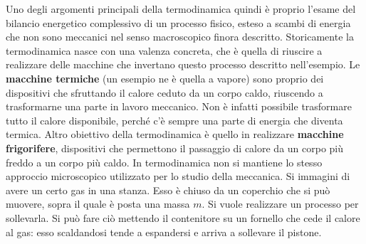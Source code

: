 \documentclass[10pt,a4paper]{book}
\begin{document}
Uno degli argomenti principali della termodinamica quindi è proprio l'esame del bilancio energetico complessivo di un processo fisico, esteso a scambi di energia che non sono meccanici nel senso macroscopico finora descritto.
Storicamente la termodinamica nasce con una valenza concreta, che è quella di riuscire a realizzare delle macchine che invertano questo processo descritto nell'esempio. Le \textbf{macchine termiche} (un esempio ne è quella a vapore) sono proprio dei dispositivi che sfruttando il calore ceduto da un corpo caldo, riuscendo a trasformarne una parte in lavoro meccanico. Non è infatti possibile trasformare tutto il calore disponibile, perché c'è sempre una parte di energia che diventa termica. Altro obiettivo della termodinamica è quello in realizzare \textbf{macchine frigorifere}, dispositivi che permettono il passaggio di calore da un corpo più freddo a un corpo più caldo.
In termodinamica non si mantiene lo stesso approccio microscopico utilizzato per lo studio della meccanica. Si immagini di avere un certo gas in una stanza. Esso è chiuso da un coperchio che si può muovere, sopra il quale è posta una massa $m$. Si vuole realizzare un processo per sollevarla. Si può fare ciò mettendo il contenitore su un fornello che cede il calore al gas: esso scaldandosi tende a espandersi e arriva a sollevare il pistone.
\end{document}

